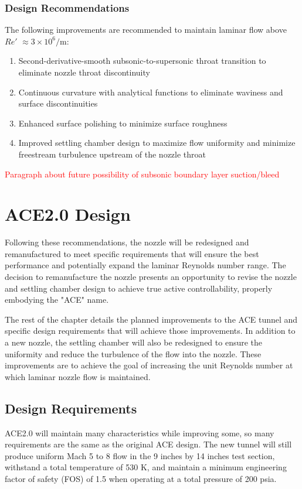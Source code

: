 \subsubsection*{Design Recommendations}

The following improvements are recommended to maintain laminar flow above $Re'$ $\approx 3 \times 10^6/\mathrm{m}$:
\begin{enumerate}
    \item Second-derivative-smooth subsonic-to-supersonic throat transition to eliminate nozzle throat discontinuity
    \item Continuous curvature with analytical functions to eliminate waviness and surface discontinuities
    \item Enhanced surface polishing to minimize surface roughness
    \item Improved settling chamber design to maximize flow uniformity and minimize freestream turbulence upstream of the nozzle throat
\end{enumerate}

\textcolor{red}{Paragraph about future possibility of subsonic boundary layer suction/bleed}

\section{ACE2.0 Design}

Following these recommendations, the nozzle will be redesigned and remanufactured to meet specific requirements that will ensure the best performance and potentially expand the laminar Reynolds number range. The decision to remanufacture the nozzle presents an opportunity to revise the nozzle and settling chamber design to achieve true active controllability, properly embodying the "ACE" name.

The rest of the chapter details the planned improvements to the ACE tunnel and specific design requirements that will achieve those improvements. In addition to a new nozzle, the settling chamber will also be redesigned to ensure the uniformity and reduce the turbulence of the flow into the nozzle. These improvements are to achieve the goal of increasing the unit Reynolds number at which laminar nozzle flow is maintained.

\subsection{Design Requirements}

ACE2.0 will maintain many characteristics while improving some, so many requirements are the same as the original ACE design. The new tunnel will still produce uniform Mach 5 to 8 flow in the 9 inches by 14 inches test section, withstand a total temperature of 530 K, and maintain a minimum engineering factor of safety (FOS) of 1.5 when operating at a total pressure of 200 psia.

